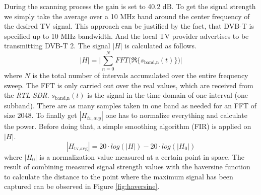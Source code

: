 \documentclass[conference]{IEEEtran}
\begin{document}
During the scanning process the gain is set to 40.2 dB. To get the
signal strength we simply take the average over a 10 MHz band around the
center frequency of the desired TV signal. This approach can be
justified by the fact, that DVB-T is specified up to 10 MHz bandwidth.
And the local TV provider advertises to be transmitting DVB-T 2.
The signal \ensuremath{|H|} is calculated as follows.  
\begin{equation}
	|H| = \Biggl| \sum_{n=0}^N FFT\biggl( \Re\{ s_{\text{band,n}}(t) \} \biggr) \Biggr|
\end{equation}     where \ensuremath{N} is the total number of intervals
accumulated over the entire frequency sweep. The FFT is only carried out over
the real values, which are received from the \textit{RTL-SDR}.
\ensuremath{s_{\text{band,n}}(t)} is the signal in the time domain of one
interval (one subband). There are as many samples taken in one band as needed
for an FFT of size 2048. To finally get \ensuremath{|H_{tv,avg}|} one has to
normalize everything and calculate the power. Before doing that, a simple
smoothing algorithm (FIR) is applied on \ensuremath{|H|}.  
\begin{equation}
	|H_{\text{tv,avg}}| = 20 \cdot log (|H|) - 20 \cdot log(|H_0|)
\end{equation}   
where \ensuremath{|H_0|} is a normalization value measured at a certain point
in space. The result of combining measured signal strength values with the
haversine function to calculate the distance to the point where the maximum
signal has been captured can be observed in Figure \ref{fig:haversine}.
\end{document}
